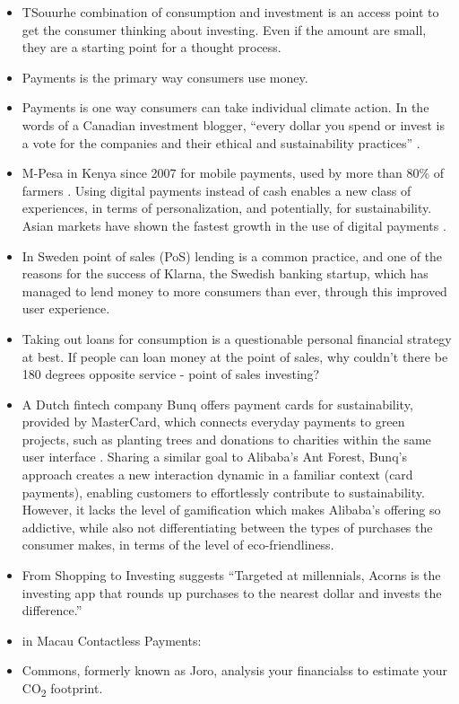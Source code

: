\documentclass[
  letterpaper,
  DIV=11,
  numbers=noendperiod]{scrartcl}
\providecommand{\tightlist}{%
  \setlength{\itemsep}{0pt}\setlength{\parskip}{0pt}}\usepackage{longtable,booktabs,array}
\begin{document}
\begin{itemize}
\tightlist
\item
  TSouurhe combination of consumption and investment is an access point
  to get the consumer thinking about investing. Even if the amount are
  small, they are a starting point for a thought process.
\item
  Payments is the primary way consumers use money.
\item
  Payments is one way consumers can take individual climate action. In
  the words of a Canadian investment blogger, ``every dollar you spend
  or invest is a vote for the companies and their ethical and
  sustainability practices'' \citep{fotheringhamHowCreateGreener2017}.
\item
  M-Pesa in Kenya since 2007 for mobile payments, used by more than 80\%
  of farmers
  \citep{tyceNeoliberalstatistDivideDrivers2020, parlascaUseMobileFinancial2022}.
  Using digital payments instead of cash enables a new class of
  experiences, in terms of personalization, and potentially, for
  sustainability. Asian markets have shown the fastest growth in the use
  of digital payments \citep{mckinseyNextFrontierAsia2020}.
\item
  In Sweden point of sales (PoS) lending is a common practice, and one
  of the reasons for the success of Klarna, the Swedish banking startup,
  which has managed to lend money to more consumers than ever, through
  this improved user experience.
\item
  Taking out loans for consumption is a questionable personal financial
  strategy at best. If people can loan money at the point of sales, why
  couldn't there be 180 degrees opposite service - point of sales
  investing?
\item
  A Dutch fintech company Bunq offers payment cards for sustainability,
  provided by MasterCard, which connects everyday payments to green
  projects, such as planting trees and donations to charities within the
  same user interface \citep{bunqBunq2020}. Sharing a similar goal to
  Alibaba's Ant Forest, Bunq's approach creates a new interaction
  dynamic in a familiar context (card payments), enabling customers to
  effortlessly contribute to sustainability. However, it lacks the level
  of gamification which makes Alibaba's offering so addictive, while
  also not differentiating between the types of purchases the consumer
  makes, in terms of the level of eco-friendliness.
\item
  From Shopping to Investing \citet{AcornsTargetsMillennials} suggests
  ``Targeted at millennials, Acorns is the investing app that rounds up
  purchases to the nearest dollar and invests the difference.''
\item
  \citet{ContactlessPaymentsPrevalent2023} in Macau Contactless
  Payments:
\item
  Commons, formerly known as Joro, analysis your financialss to estimate
  your CO\textsubscript{2} footprint.
  \citet{chantPersonalCarboncuttingApp2022}
\end{itemize}
\end{document}
